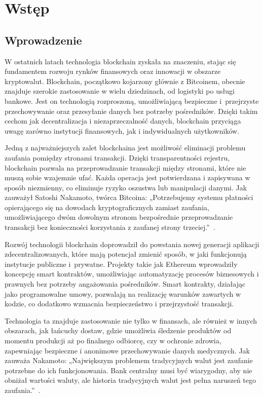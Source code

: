 \chapter{Wstęp}

\section{Wprowadzenie}

W ostatnich latach technologia blockchain zyskała na znaczeniu, stając się fundamentem rozwoju rynków finansowych oraz innowacji w obszarze kryptowalut. Blockchain, początkowo kojarzony głównie z Bitcoinem, obecnie znajduje szerokie zastosowanie w wielu dziedzinach, od logistyki po usługi bankowe. Jest on technologią rozproszoną, umożliwiającą bezpieczne i~przejrzyste przechowywanie oraz przesyłanie danych bez potrzeby pośredników. Dzięki takim cechom jak decentralizacja i niezaprzeczalność danych, blockchain przyciąga uwagę zarówno instytucji finansowych, jak i indywidualnych użytkowników.

Jedną z najważniejszych zalet blockchaina jest możliwość eliminacji problemu zaufania pomiędzy stronami transakcji. Dzięki transparentności rejestru, blockchain pozwala na przeprowadzanie transakcji między stronami, które nie muszą sobie wzajemnie ufać. Każda operacja jest potwierdzana i zapisywana w sposób niezmienny, co eliminuje ryzyko oszustwa lub manipulacji danymi. Jak zauważył Satoshi Nakamoto, twórca Bitcoina: „Potrzebujemy systemu płatności opierającego się na dowodach kryptograficznych zamiast zaufania, umożliwiającego dwóm dowolnym stronom bezpośrednie przeprowadzanie transakcji bez konieczności korzystania z zaufanej strony trzeciej.”~\cite{nakamoto_2008}.

Rozwój technologii blockchain doprowadził do powstania nowej generacji aplikacji zdecentralizowanych, które mają potencjał zmienić sposób, w jaki funkcjonują instytucje publiczne i~prywatne. Projekty takie jak Ethereum wprowadziły koncepcję smart kontraktów, umożliwiając automatyzację procesów biznesowych i prawnych bez potrzeby angażowania pośredników. Smart kontrakty, działając jako programowalne umowy, pozwalają na realizację warunków zawartych w kodzie, co dodatkowo wzmacnia bezpieczeństwo i przejrzystość transakcji.

Technologia ta znajduje zastosowanie nie tylko w finansach, ale również w innych obszarach, jak łańcuchy dostaw, gdzie umożliwia śledzenie produktów od momentu produkcji aż po finalnego odbiorcę, czy w ochronie zdrowia, zapewniając bezpieczne i anonimowe przechowywanie danych medycznych. Jak zauważa Nakamoto: „Największym problemem tradycyjnych walut jest zaufanie potrzebne do ich funkcjonowania. Bank centralny musi być wiarygodny, aby nie obniżał wartości waluty, ale historia tradycyjnych walut jest pełna naruszeń tego zaufania.”~\cite{nakamoto_2008}.

